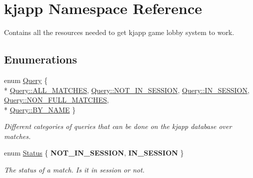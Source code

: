 \hypertarget{namespacekjapp}{}\section{kjapp Namespace Reference}
\label{namespacekjapp}


Contains all the resources needed to get kjapp game lobby system to work.  


\subsection*{Enumerations}
\begin{DoxyCompactItemize}
\item 
enum \hyperlink{namespacekjapp_a98b9b721617fe3ae75dd6f92507d2121}{Query} \{ \\*
\hyperlink{namespacekjapp_a98b9b721617fe3ae75dd6f92507d2121a446d73d3d33c027a52dea354cbb89f6a}{Query\+::\+A\+L\+L\+\_\+\+M\+A\+T\+C\+H\+ES}, 
\hyperlink{namespacekjapp_a98b9b721617fe3ae75dd6f92507d2121a18a470572636e1681c90bcfd186c90d1}{Query\+::\+N\+O\+T\+\_\+\+I\+N\+\_\+\+S\+E\+S\+S\+I\+ON}, 
\hyperlink{namespacekjapp_a98b9b721617fe3ae75dd6f92507d2121adb763e1606844ad7b28517112f999292}{Query\+::\+I\+N\+\_\+\+S\+E\+S\+S\+I\+ON}, 
\hyperlink{namespacekjapp_a98b9b721617fe3ae75dd6f92507d2121ae7b891a89f0e4fcea5a49f69d681ecf8}{Query\+::\+N\+O\+N\+\_\+\+F\+U\+L\+L\+\_\+\+M\+A\+T\+C\+H\+ES}, 
\\*
\hyperlink{namespacekjapp_a98b9b721617fe3ae75dd6f92507d2121a91d2f758dc36530a732923fcb757f4ab}{Query\+::\+B\+Y\+\_\+\+N\+A\+ME}
 \}\begin{DoxyCompactList}\small\item\em Different categories of queries that can be done on the kjapp database over matches. \end{DoxyCompactList}
\item 
enum \hyperlink{namespacekjapp_a424e0b2658aa21768d94092bc8155d5e}{Status} \{ {\bfseries N\+O\+T\+\_\+\+I\+N\+\_\+\+S\+E\+S\+S\+I\+ON}, 
{\bfseries I\+N\+\_\+\+S\+E\+S\+S\+I\+ON}
 \}\hypertarget{namespacekjapp_a424e0b2658aa21768d94092bc8155d5e}{}\label{namespacekjapp_a424e0b2658aa21768d94092bc8155d5e}
\begin{DoxyCompactList}\small\item\em The status of a match. Is it in session or not. \end{DoxyCompactList}
\end{DoxyCompactItemize}

